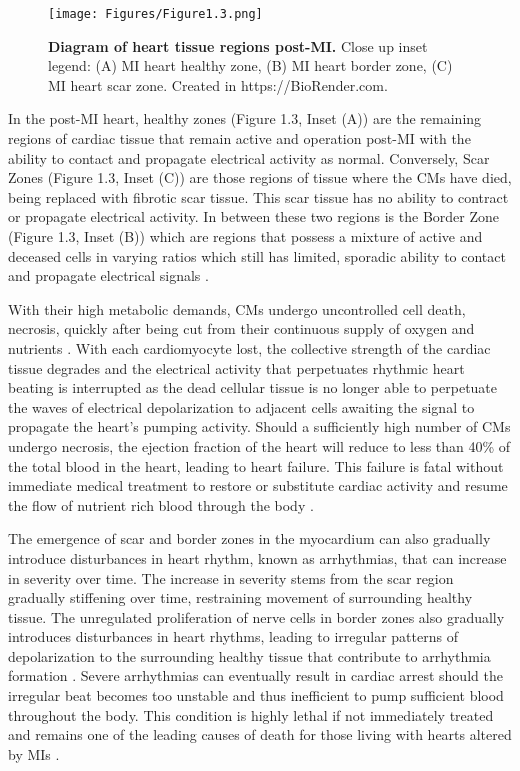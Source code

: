 \begin{figure}[H]
    \centering
    \texttt{[image: Figures/Figure1.3.png]}
    \caption{\textbf{Diagram of heart tissue regions post-MI.} Close up inset legend: (A) MI heart healthy zone, (B) MI heart border zone, (C) MI heart scar zone. Created in  https://BioRender.com.}
    \label{fig:postMI}
\end{figure}

In the post-MI heart, healthy zones (Figure 1.3, Inset (A)) are the remaining regions of cardiac tissue that remain active and operation post-MI with the ability to contact and propagate electrical activity as normal. Conversely, Scar Zones (Figure 1.3, Inset (C)) are those regions of tissue where the CMs have died, being replaced with fibrotic scar tissue. This scar tissue has no ability to contract or propagate electrical activity. In between these two regions is the Border Zone (Figure 1.3, Inset (B)) which are regions that possess a mixture of active and deceased cells in varying ratios which still has limited, sporadic ability to contact and propagate electrical signals \cite{huethorst_development_2022}.

With their high metabolic demands, CMs undergo uncontrolled cell death, necrosis, quickly after being cut from their continuous supply of oxygen and nutrients \cite{huethorst_development_2022}. With each cardiomyocyte lost, the collective strength of the cardiac tissue degrades and the electrical activity that perpetuates rhythmic heart beating is interrupted as the dead cellular tissue is no longer able to perpetuate the waves of electrical depolarization to adjacent cells awaiting the signal to propagate the heart’s pumping activity. Should a sufficiently high number of CMs undergo necrosis, the ejection fraction of the heart will reduce to less than 40\% of the total blood in the heart, leading to heart failure. This failure is fatal without immediate medical treatment to restore or substitute cardiac activity and resume the flow of nutrient rich blood through the body \cite{golla_heart_2025}. 

The emergence of scar and border zones in the myocardium can also gradually introduce disturbances in heart rhythm, known as arrhythmias, that can increase in severity over time. The increase in severity stems from the scar region gradually stiffening over time, restraining movement of surrounding healthy tissue. The unregulated proliferation of nerve cells in border zones also gradually introduces disturbances in heart rhythms, leading to irregular patterns of depolarization to the surrounding healthy tissue that contribute to arrhythmia formation \cite{amoni_heterogeneity_2023, huethorst_development_2022}. Severe arrhythmias can eventually result in cardiac arrest should the irregular beat becomes too unstable and thus inefficient to pump sufficient blood throughout the body. This condition is highly lethal if not immediately treated and remains one of the leading causes of death for those living with hearts altered by MIs \cite{golla_heart_2025}.  




